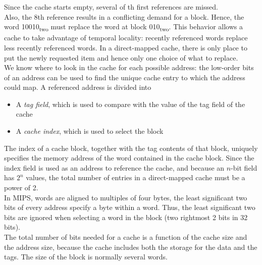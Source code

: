 \documentclass[12pt]{article}
\theoremstyle{definition}
\begin{document}
  Since the cache starts empty, several of th first references are missed. \\
  Also, the 8th reference results in a conflicting demand for a block.
  Hence, the word 10010\textsubscript{two} must replace the word at block 010\textsubscript{two}.
  This behavior allows a cache to take advantage of temporal locality: recently referenced words replace less recently referenced words.
  In a direct-mapped cache, there is only place to put the newly requested item and hence only one choice of what to replace. \\

  We know where to look in the cache for each possible address: the low-order bits of an address can be used to find the unique cache entry to which the address could map.
  A referenced address is divided into
  \begin{itemize}
    \item A \emph{tag field}, which is used to compare with the value of the tag field of the cache
    \item A \emph{cache index}, which is used to select the block
  \end{itemize}
  The index of a cache block, together with the tag contents of that block, uniquely specifies the memory address of the word contained in the cache block.
  Since the index field is used as an address to reference the cache, and because an $n$-bit field has $2^{n}$ values, the total number of entries in a direct-mapped cache must be a power of 2. \\
  In MIPS, words are aligned to multiples of four bytes, the least significant two bits of every address specify a byte within a word.
  Thus, the least significant two bits are ignored when selecting a word in the block (two rightmost 2 bits in 32 bits). \\

  The total number of bits needed for a cache is a function of the cache size and the address size, because the cache includes both the storage for the data and the tags.
  The size of the block is normally several words. \\
\end{document}
